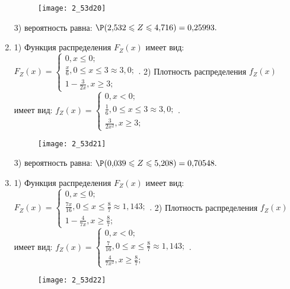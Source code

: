 \documentclass[a4paper,12pt]{article}
\begin{document}
\begin{enumerate}
\begin{figure}[H]
    \texttt{[image: 2\_53d20]}
\end{figure}


3) вероятность равна:
$
\P(2,\!532\leqslant Z\leqslant 4,\!716)=
0,\!25993.
$



\item


1) Функция распределения $F_Z(x)$ имеет вид:
$
F_Z(x)=\left\{
\begin{array}{l}
0, x\leqslant 0;\\
\frac{x}{6}, 0\leqslant x\leqslant 3\approx 3,\!0;\\
1 - \frac{3}{2 x}, x\geqslant3;
\end{array}.
\right.
$
2) Плотность распределения $f_Z(x)$ имеет вид:
$
f_Z(x)=\left\{
\begin{array}{l}
0, x<0;\\
\frac{1}{6}, 0\leqslant x\leqslant 3\approx 3,\!0;\\
\frac{3}{2 x^{2}}, x\geqslant3;
\end{array}.
\right.
$


\begin{figure}[H]
    \texttt{[image: 2\_53d21]}
\end{figure}


3) вероятность равна:
$
\P(0,\!039\leqslant Z\leqslant 5,\!208)=
0,\!70548.
$



\item


1) Функция распределения $F_Z(x)$ имеет вид:
$
F_Z(x)=\left\{
\begin{array}{l}
0, x\leqslant 0;\\
\frac{7 x}{16}, 0\leqslant x\leqslant \frac{8}{7}\approx 1,\!143;\\
1 - \frac{4}{7 x}, x\geqslant\frac{8}{7};
\end{array}.
\right.
$
2) Плотность распределения $f_Z(x)$ имеет вид:
$
f_Z(x)=\left\{
\begin{array}{l}
0, x<0;\\
\frac{7}{16}, 0\leqslant x\leqslant \frac{8}{7}\approx 1,\!143;\\
\frac{4}{7 x^{2}}, x\geqslant\frac{8}{7};
\end{array}.
\right.
$


\begin{figure}[H]
    \texttt{[image: 2\_53d22]}
\end{figure}



\end{enumerate}
\end{document}
